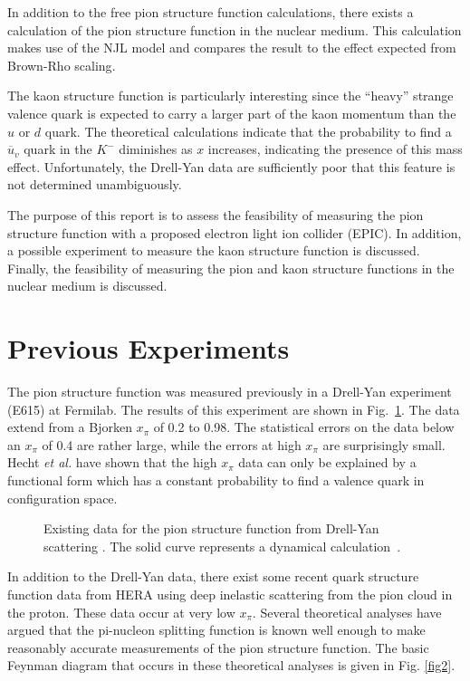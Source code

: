 In addition to the free pion structure function calculations, there
exists a calculation of the pion structure function in the nuclear
medium\cite{suzuki}.  This calculation makes use of the NJL model and
compares the result to the effect expected from Brown-Rho
scaling\cite{brown}.

The kaon structure function is particularly interesting since the
``heavy'' strange valence quark is expected to carry a larger part of
the kaon momentum than the $u$ or $d$ quark.  The theoretical
calculations\cite{shigetani} indicate that the probability to find a
$\overline{u}_v$ quark in the $K^-$ diminishes as $x$ increases,
indicating the presence of this mass effect.  Unfortunately, the
Drell-Yan data\cite{badier} are sufficiently poor that this feature is
not determined unambiguously.

The purpose of this report is to assess the feasibility of measuring
the pion structure function with a proposed\cite{bland} electron light
ion collider (EPIC).  In addition, a possible experiment to measure
the kaon structure function is discussed.  Finally, the feasibility of
measuring the pion and kaon structure functions in the nuclear medium
is discussed.


\section*{Previous Experiments}

The pion structure function was measured previously in a Drell-Yan
experiment\cite{conway} (E615) at Fermilab.  The results of this
experiment are shown in Fig.~\ref{fig1}.  The data extend from a Bjorken
$x_\pi$ of 0.2 to 0.98.  The statistical errors on the data below an
$x_\pi$ of 0.4 are rather large, while the errors at high $x_\pi$ are
surprisingly small.  Hecht {\it et al.} \cite{hecht} have shown that
the high $x_\pi$ data can only be explained by a functional form which
has a constant probability to find a valence quark in configuration
space.

\begin{figure} %
\centerline{}
\caption{Existing data for the pion structure function from Drell-Yan
         scattering \protect\cite{conway}.  The solid curve represents
         a dynamical calculation~\protect\cite{hecht}. }
\label{fig1}
\end{figure}

In addition to the Drell-Yan data, there exist some recent quark
structure function data\cite{adloff} from HERA using deep inelastic
scattering from the pion cloud in the proton.  These data occur at
very low $x_\pi$.  Several theoretical analyses
\cite{pirner,holtmann,kopeliovich} have argued that the pi-nucleon
splitting function is known well enough to make reasonably accurate
measurements of the pion structure function.  The basic Feynman
diagram that occurs in these theoretical analyses is given in
Fig. \ref{fig2}.

